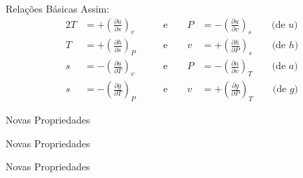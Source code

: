     \begin{frame}{Relações Básicas}\vspace*{-0em}
        Assim:
        \begin{alignat*}{2}
            T                 &=  +\left(\frac{\partial u}{\partial s}\right)_v\qquad     &
            \mbox{e}\qquad P  &=  -\left(\frac{\partial u}{\partial v}\right)_s\qquad\mbox{(de $u$)}   \\
            T                 &=  +\left(\frac{\partial h}{\partial s}\right)_P\qquad     &
            \mbox{e}\qquad v  &=  +\left(\frac{\partial h}{\partial P}\right)_s\qquad\mbox{(de $h$)}   \\
            s                 &=  -\left(\frac{\partial a}{\partial T}\right)_v\qquad     &
            \mbox{e}\qquad P  &=  -\left(\frac{\partial a}{\partial v}\right)_T\qquad\mbox{(de $a$)}   \\
            s                 &=  -\left(\frac{\partial g}{\partial T}\right)_P\qquad     &
            \mbox{e}\qquad v  &=  +\left(\frac{\partial g}{\partial P}\right)_T\qquad\mbox{(de $g$)}
        \end{alignat*}
    \end{frame}

    \begin{frame}{Novas Propriedades}\vspace*{-1em}
    \end{frame}

    \begin{frame}{Novas Propriedades}\vspace*{-1em}
    \end{frame}

    \begin{frame}{Novas Propriedades}\vspace*{-1em}
    \end{frame}

